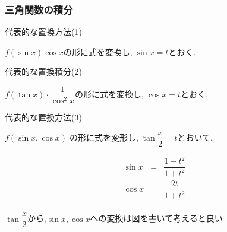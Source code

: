 \documentclass[a4paper]{jsarticle}
\begin{document}
\subsubsection{三角関数の積分}
\begin{itembox}[l]{代表的な置換方法(1)}
    \begin{center}
        $f\left(\sin x\right)\cos x$の形に式を変換し,$\; \sin x= t$とおく.
    \end{center}
\end{itembox}
\begin{itembox}[l]{代表的な置換積分(2)}
    \begin{center}
        $f\left(\tan x\right)\cdot \dfrac{1}{\cos^2 x}$の形に式を変換し,$\; \cos x= t$とおく.
    \end{center}
\end{itembox}
\begin{itembox}[l]{代表的な置換方法(3)}
    \begin{center}
        $f\left(\sin x,\cos x\right)\;$の形に式を変形し,$\; \tan\dfrac{x}{2}=t$とおいて,
    \end{center}
    \begin{eqnarray*}
        \sin x&=&\dfrac{1-t^2}{1+t^2}\\
        \cos x&=&\dfrac{2t}{1+t^2}\\
    \end{eqnarray*}
    \begin{center}
        $\tan\dfrac{x}{2}$から,$\sin x,\cos x$への変換は図を書いて考えると良い
    \end{center}
\end{itembox}
\end{document}
